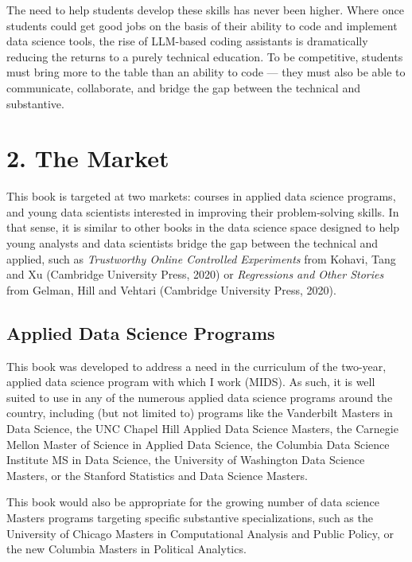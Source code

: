 \documentclass[12pt]{article}
\begin{document}
The need to help students develop these skills has never been higher.
Where once students could get good jobs on the basis of their ability to
code and implement data science tools, the rise of LLM-based coding
assistants is dramatically reducing the returns to a purely technical
education. To be competitive, students must bring more to the table than
an ability to code --- they must also be able to communicate,
collaborate, and bridge the gap between the technical and substantive.

\section*{2. The Market}\label{the-market}

This book is targeted at two markets: courses in applied data science
programs, and young data scientists interested in improving their
problem-solving skills. In that sense, it is similar to other books in
the data science space designed to help young analysts and data
scientists bridge the gap between the technical and applied, such as
\emph{Trustworthy Online Controlled Experiments} from Kohavi, Tang and
Xu (Cambridge University Press, 2020) or \emph{Regressions and Other
Stories} from Gelman, Hill and Vehtari (Cambridge University Press,
2020).

\subsection*{Applied Data Science
Programs}\label{applied-data-science-programs}

This book was developed to address a need in the curriculum of the
two-year, applied data science program with which I work (MIDS). As
such, it is well suited to use in any of the numerous applied data
science programs around the country, including (but not limited to)
programs like the Vanderbilt Masters in Data Science, the UNC Chapel
Hill Applied Data Science Masters, the Carnegie Mellon Master of Science
in Applied Data Science, the Columbia Data Science Institute MS in Data
Science, the University of Washington Data Science Masters, or the
Stanford Statistics and Data Science Masters.

This book would also be appropriate for the growing number of data
science Masters programs targeting specific substantive specializations,
such as the University of Chicago Masters in Computational Analysis and
Public Policy, or the new Columbia Masters in Political Analytics.
\end{document}
